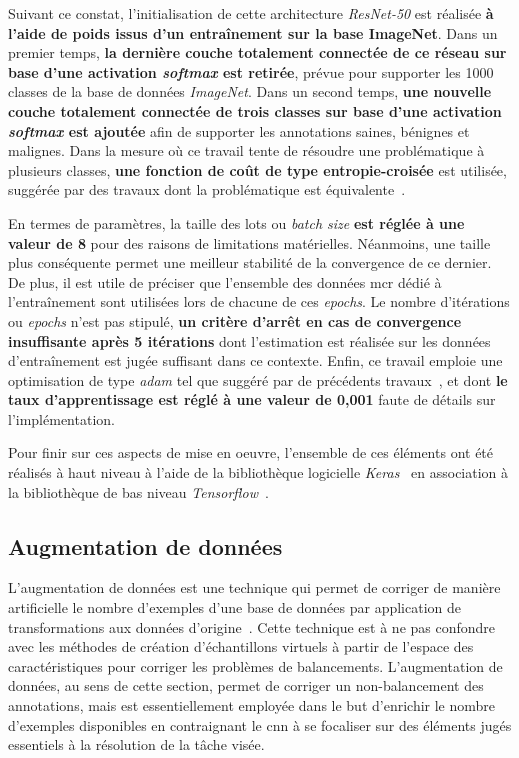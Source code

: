 Suivant ce constat, l'initialisation de cette architecture \textit{ResNet-50} est réalisée \textbf{à l'aide de poids issus d'un entraînement sur la base ImageNet}. Dans un premier temps, \textbf{la dernière couche totalement connectée de ce réseau sur base d'une activation \textit{softmax} est retirée}, prévue pour supporter les 1000 classes de la base de données \textit{ImageNet}. Dans un second temps, \textbf{une nouvelle couche totalement connectée de trois classes sur base d'une activation \textit{softmax} est ajoutée} afin de supporter les annotations saines, bénignes et malignes. Dans la mesure où ce travail tente de résoudre une problématique à plusieurs classes, \textbf{une fonction de coût de type entropie-croisée} est utilisée, suggérée par des travaux dont la problématique est équivalente~\cite{Barbu2018,Park2019}.\par

En termes de paramètres, la taille des lots ou \textit{batch size} \textbf{est réglée à une valeur de 8} pour des raisons de limitations matérielles. Néanmoins, une taille plus conséquente permet une meilleur stabilité de la convergence de ce dernier. De plus, il est utile de préciser que l'ensemble des données \gls{mcr} dédié à l'entraînement sont utilisées lors de chacune de ces \textit{epochs}. Le nombre d'itérations ou \textit{epochs} n'est pas stipulé, \textbf{un critère d'arrêt en cas de convergence insuffisante après 5 itérations} dont l'estimation est réalisée sur les données d'entraînement est jugée suffisant dans ce contexte. Enfin, ce travail emploie une optimisation de type \textit{adam} tel que suggéré par de précédents travaux~\cite{Barbu2018,Park2019}, et dont \textbf{le taux d'apprentissage est réglé à une valeur de 0,001} faute de détails sur l'implémentation.\par

Pour finir sur ces aspects de mise en oeuvre, l'ensemble de ces éléments ont été réalisés à haut niveau à l'aide de la bibliothèque logicielle \textit{Keras}~\cite{chollet2015} en association à la bibliothèque de bas niveau \textit{Tensorflow}~\cite{Tensorflow2016}.\par

\subsection{Augmentation de données}
L'augmentation de données est une technique qui permet de corriger de manière artificielle le nombre d'exemples d'une base de données par application de transformations aux données d'origine~\cite{Wong2016,Taylor2018}. Cette technique est à ne pas confondre avec les méthodes de création d'échantillons virtuels à partir de l'espace des caractéristiques pour corriger les problèmes de balancements. L'augmentation de données, au sens de cette section, permet de corriger un non-balancement des annotations, mais est essentiellement employée dans le but d'enrichir le nombre d'exemples disponibles en contraignant le \gls{cnn} à se focaliser sur des éléments jugés essentiels à la résolution de la tâche visée.\par

